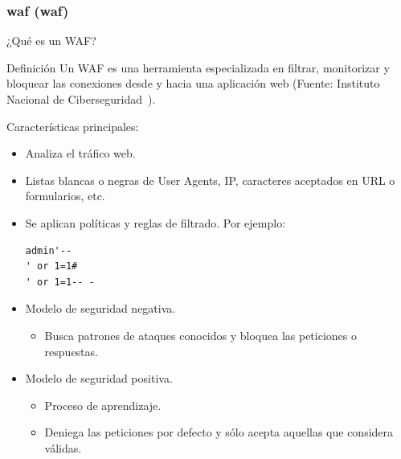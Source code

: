 \begin{frame}[shrink=20,fragile]
  \frametitle{\acrlong{waf} (\acrshort{waf})}
  ¿Qué es un WAF?
  \begin{exampleblock}{Definición}
    Un WAF es una herramienta especializada en filtrar, monitorizar y bloquear las conexiones desde y hacia una aplicación web (Fuente: Instituto Nacional de Ciberseguridad~\cite{incibewaf}).
  \end{exampleblock}
  Características principales:
  \begin{itemize}
    \item Analiza el tráfico web.
    \item Listas blancas o negras de User Agents, IP, caracteres aceptados en URL o formularios, etc.
    \item Se aplican políticas y reglas de filtrado. Por ejemplo:
        \begin{lstlisting}
admin'--
' or 1=1#
' or 1=1-- -
        \end{lstlisting}
    \item Modelo de seguridad negativa.
      \begin{itemize}
        \item Busca patrones de ataques conocidos y bloquea las peticiones o respuestas.
      \end{itemize}
    \item Modelo de seguridad positiva.
      \begin{itemize}
        \item Proceso de aprendizaje.
        \item Deniega las peticiones por defecto y sólo acepta aquellas que considera válidas.
      \end{itemize}
  \end{itemize}
\end{frame}

